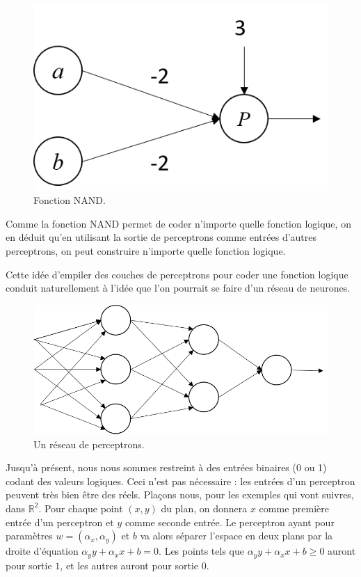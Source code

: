 \begin{figure}[h]
  \centering
  \includegraphics[scale=0.5]{assets/nand-perceptron}
  \caption{Fonction NAND.}
  \label{fig:nand-perceptron}
\end{figure}

Comme la fonction NAND permet de coder n'importe quelle fonction logique, 
on en déduit qu'en utilisant la sortie de perceptrons comme entrées d'autres 
perceptrons, on peut construire n'importe quelle fonction logique.

Cette idée d'empiler des couches de perceptrons pour coder une fonction logique 
conduit naturellement à l'idée que l'on pourrait se faire d'un réseau de neurones.

\begin{figure}[h]
  \centering
  \includegraphics[scale=0.5]{assets/perceptron-network}
  \caption{Un réseau de perceptrons.}
  \label{fig:perceptron-network}
\end{figure}

Jusqu'à présent, nous nous sommes restreint à des entrées binaires (0 ou 1) 
codant des valeurs logiques. Ceci n'est pas nécessaire : les entrées d'un perceptron 
peuvent très bien être des réels.
Plaçons nous, pour les exemples qui vont suivres, dans $\mathbb{R}^2$. 
Pour chaque point $(x, y)$ du plan, on donnera $x$ comme première entrée d'un 
perceptron et $y$ comme seconde entrée. 
Le perceptron ayant pour paramètres $w=(\alpha_x, \alpha_y)$ et $b$ va alors 
séparer l'espace en deux plans par la droite d'équation $\alpha_y y + \alpha_x x + b = 0$. 
Les points tels que $\alpha_y y + \alpha_x x + b \geq 0$ auront pour sortie $1$, et 
les autres auront pour sortie $0$.

